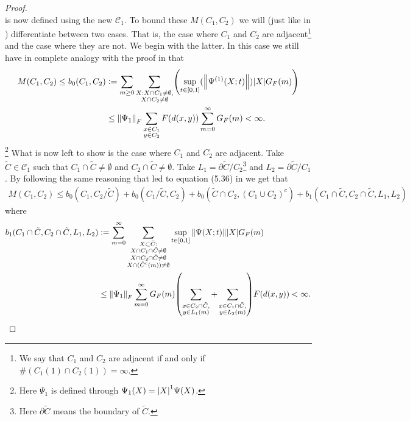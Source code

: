 \documentclass[12pt,a4paper,twoside]{article}
\numberwithin{equation}{section}
\begin{document}
\begin{proof}
\begin{equation}
	\end{equation}
	is now defined using the new $\mathcal{C}_1$. To bound these $M(C_1,C_2)$ we will (just like in \cite{ogata2021h3gmathbb}) differentiate between two cases. That is, the case where $C_1$ and $C_2$ are adjacent\footnote{We say that $C_1$ and $C_2$ are adjacent if and only if $\#(C_1(1)\cap C_2(1))=\infty$.} and the case where they are not. We begin with the latter. In this case we still have in complete analogy with the proof in \cite{ogata2021h3gmathbb} that
	\begin{align}
		M(C_1,C_2)\leq b_0(C_1,C_2) &\defeq \sum_{m\geq 0}\sum_{\substack{X:X\cap C_1\neq\emptyset,\\X\cap C_2\neq\emptyset}}\left(\sup_{t\in[0,1]}(\norm{\Psi^{(1)}(X;t)})\abs{X}G_F(m)\right)\\
		&\leq \norm{\Psi_1}_F\sum_{\substack{x\in C_1\\y\in C_2}}F(d(x,y))\sum_{m=0}^\infty G_F(m)<\infty.
	\end{align}
	\footnote{Here $\Psi_1$ is defined through $\Psi_1(X)=\abs{X}^1 \Psi(X)$.} What is now left to show is the case where $C_1$ and $C_2$ are adjacent. Take $\tilde{C}\in\mathcal{C}_1$ such that $C_1\cap\tilde{C}\neq\emptyset$ and $C_2\cap\tilde{C}\neq\emptyset$. Take $L_1=\partial\tilde{C}/C_2$\footnote{Here $\partial \tilde{C}$ means the boundary of $\tilde C$.} and $L_2=\partial\tilde{C}/C_1$. By following the same reasoning that led to equation (5.36) in \cite{ogata2021h3gmathbb} we get that
	\begin{align}
		M(C_1,C_2)\leq b_0(C_1,C_2/\tilde{C})+b_0(C_1/\tilde{C},C_2)+b_0(\tilde{C}\cap C_2,(C_1\cup C_2)^c)+b_1(C_1\cap\tilde{C},C_2\cap\tilde{C},L_1,L_2)
	\end{align}
	where
	\begin{align}
		b_1(C_1\cap\tilde{C},C_2\cap\tilde{C},L_1,L_2)&\defeq\sum_{m=0}^\infty \sum_{\substack{X\subset \tilde{C}:\\ X\cap C_1\cap\tilde{C}\neq\emptyset\\X\cap C_2\cap\tilde{C}\neq\emptyset\\ X\cap (\tilde{C}^c(m))\neq\emptyset}}\sup_{t\in[0,1]}\norm{\Psi(X;t)}\abs{X}G_F(m)\\
		&\leq \norm{\Psi_1}_F\sum_{m=0}^{\infty}G_F(m)\left(\sum_{\substack{x\in C_2\cap\tilde{C},\\y\in L_1(m)}}+\sum_{\substack{x\in C_1\cap\tilde{C},\\y\in L_2(m)}}\right)F(d(x,y))<\infty.
	\end{align}

\end{proof}
\end{document}
